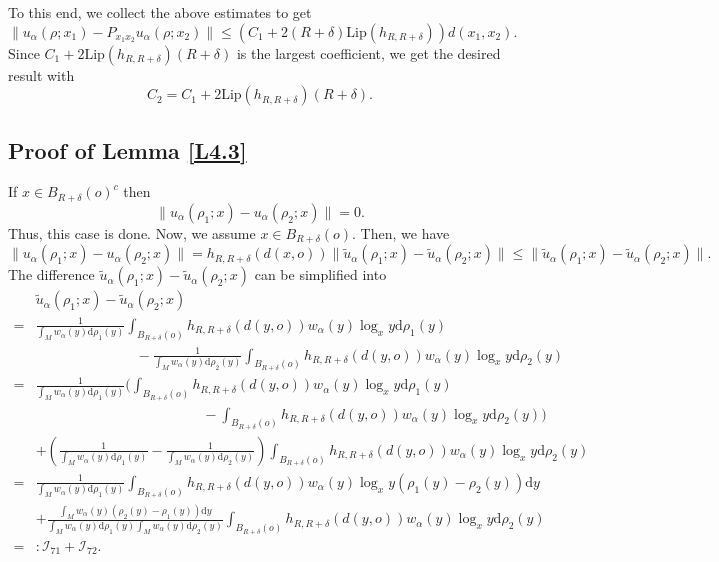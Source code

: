 \documentclass[11pt]{amsart}
\def\d{\mathrm{d}}
\newcommand{\p}{o}%
\newcommand{\dist}{d}%
\begin{document}
To this end, we  collect the above estimates to get
\[
\|u_\alpha(\rho;x_1)-P_{x_1x_2}u_\alpha(\rho;x_2)\|\leq \left(C_1+2(R+\delta)\mathrm{Lip}(h_{R,R+\delta})\right)\dist(x_1,x_2).
\]
Since $C_1+2\mathrm{Lip}(h_{R,R+\delta})(R+\delta)$ is the largest coefficient, we get the desired result with
\[
C_2=C_1+2\mathrm{Lip}(h_{R,R+\delta})(R+\delta).
\]


\subsection{Proof of Lemma \ref{L4.3}}\label{proof:L4.3}
If $x\in B_{R+\delta}(\p)^c$ then
\[
\|{u}_\alpha(\rho_1;x)-{u}_\alpha(\rho_2;x)\|=0.
\]
Thus, this case is done.  Now, we assume $x\in B_{R+\delta}(\p)$. Then, we have
\[
\|{u}_\alpha(\rho_1;x)-{u}_\alpha(\rho_2;x)\|=h_{R,R+\delta}(\dist(x, \p))\|\tilde{u}_\alpha(\rho_1;x)-\tilde{u}_\alpha(\rho_2;x)\|\leq\|\tilde{u}_\alpha(\rho_1;x)-\tilde{u}_\alpha(\rho_2;x)\|.
\]
The difference $\tilde{u}_\alpha(\rho_1;x)-\tilde{u}_\alpha(\rho_2;x)$ can be simplified into
\begin{align*}
&\tilde{u}_\alpha(\rho_1;x)-\tilde{u}_\alpha(\rho_2;x)\\
=&\frac{1}{\int_{M}w_\alpha(y)\d \rho_1(y)}\int_{B_{R+\delta}(\p)}h_{R, R+\delta}(\dist(y, \p))w_\alpha(y)\log_xy\d \rho_1(y)\\
&\hspace{3cm}-\frac{1}{\int_{M}w_\alpha(y)\d \rho_2(y)}\int_{B_{R+\delta}(\p)}h_{R, R+\delta}(\dist(y, \p))w_\alpha(y)\log_xy\d \rho_2(y)
\\
=&\frac{1}{\int_{M}w_\alpha(y)\d \rho_1(y)}\bigg(\int_{B_{R+\delta}(\p)}h_{R, R+\delta}(\dist(y, \p))w_\alpha(y)\log_xy\d \rho_1(y)\\
&\hspace{5cm}-\int_{B_{R+\delta}(\p)}h_{R, R+\delta}(\dist(y, \p))w_\alpha(y)\log_xy\d \rho_2(y)\bigg)\\
&+\left(\frac{1}{\int_{M}w_\alpha(y)\d \rho_1(y)}-\frac{1}{\int_{M}w_\alpha(y)\d \rho_2(y)}\right)\int_{B_{R+\delta}(\p)}h_{R, R+\delta}(\dist(y, \p))w_\alpha(y)\log_xy\d \rho_2(y)\\
=&\frac{1}{\int_{M}w_\alpha(y)\d \rho_1(y)}\int_{B_{R+\delta}(\p)}h_{R, R+\delta}(\dist(y, \p))w_\alpha(y)\log_xy(\rho_1(y)-\rho_2(y))\d y\\
&+\frac{\int_{M}w_\alpha(y)(\rho_2(y)-\rho_1(y))\d y}{\int_{M}w_\alpha(y)\d \rho_1(y)\int_{M}w_\alpha(y)\d \rho_2(y)}\int_{B_{R+\delta}(\p)}h_{R, R+\delta}(\dist(y, \p))w_\alpha(y)\log_xy\d \rho_2(y)\\
=&:\mathcal{I}_{71}+\mathcal{I}_{72}.
\end{align*}
\end{document}
